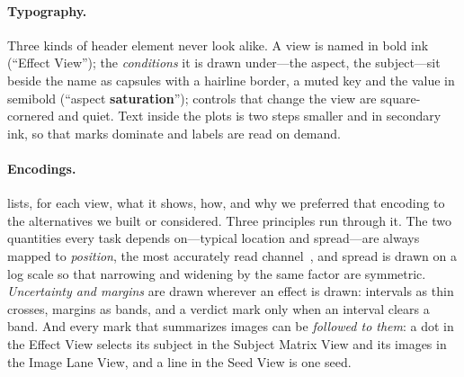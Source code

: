 \documentclass[review]{vgtc}                 %
\begin{document}
\paragraph{Typography.}
Three kinds of header element never look alike. A view is named in bold ink (``Effect View''); the \emph{conditions} it is drawn under---the aspect, the subject---sit beside the name as capsules with a hairline border, a muted key and the value in semibold (``aspect \textbf{saturation}''); controls that change the view are square-cornered and quiet. Text inside the plots is two steps smaller and in secondary ink, so that marks dominate and labels are read on demand.

\paragraph{Encodings.}
 lists, for each view, what it shows, how, and why we preferred that encoding to the alternatives we built or considered. Three principles run through it. The two quantities every task depends on---typical location and spread---are always mapped to \emph{position}, the most accurately read channel~\cite{cleveland}, and spread is drawn on a log scale so that narrowing and widening by the same factor are symmetric. \emph{Uncertainty and margins} are drawn wherever an effect is drawn: intervals as thin crosses, margins as bands, and a verdict mark only when an interval clears a band. And every mark that summarizes images can be \emph{followed to them}: a dot in the Effect View selects its subject in the Subject Matrix View and its images in the Image Lane View, and a line in the Seed View is one seed.
\end{document}
